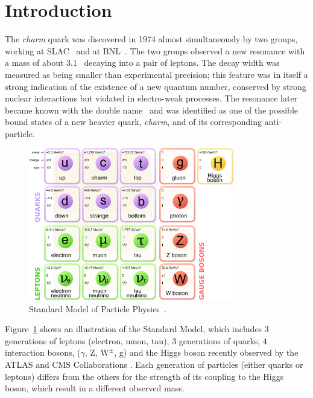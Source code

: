 \documentclass[12pt, a4paper, twoside, titlepage]{article}
\begin{document}

\section{Introduction}
The \emph{charm} quark was discovered in 1974 almost simultaneously by two groups, working at SLAC~\cite{Richter:1974} and at BNL~\cite{Ting:1974}.
The two groups observed a new resonance with a mass of about 3.1 \GeVcsq\ decaying into a pair of leptons.
The decay width was measured as being smaller than experimental precision; this feature
was in itself a strong indication of the existence of a new quantum number, conserved by strong nuclear interactions 
but violated in electro-weak processes.
The resonance later became known with the double name \jpsi\ and was identified as one of the possible bound states
of a new heavier quark, \emph{charm}, and of its corresponding anti-particle. 

\begin{figure}[tbh]
\begin{center}
\includegraphics[width=0.8\textwidth]{img/standard_model}
 \caption{Standard Model of Particle Physics~\cite{Wikipedia:StandardModel}.} 
 \label{fig:standard_model}
\end{center}
\end{figure}

Figure~\ref{fig:standard_model} shows an illustration of the Standard Model, which includes
3 generations of leptons (electron, muon, tau), 3 generations of quarks, 4 interaction bosons, ($\gamma$, Z, $\mathrm{W}^{\pm}$, g) and the Higgs boson
recently observed by the ATLAS and CMS Collaborations \cite{ATLAS:2012b,CMS:2012d}.
Each generation of particles (either quarks or leptons) differs from the others for the strength of its coupling to the Higgs boson,
which result in a different observed mass.
\end{document}
